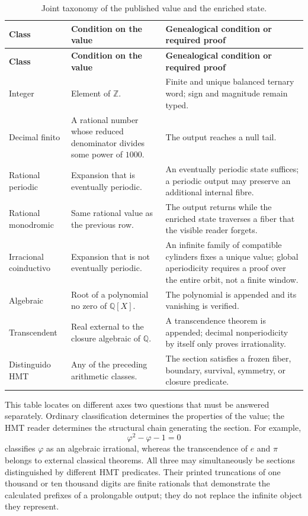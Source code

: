 \begin{longtable}{@{}>{\raggedright\arraybackslash}p{}
                    >{\raggedright\arraybackslash}p{}
                    >{\raggedright\arraybackslash}p{}@{}}
\caption{Joint taxonomy of the published value and the enriched state.}
\label{p3-83-c44-s1:tab:taxonomia-conjunta-numeros-rev11}\\
\toprule
\textbf{Class} & \textbf{Condition on the value} &
\textbf{Genealogical condition or required proof}\\
\midrule
\endfirsthead
\toprule
\textbf{Class} & \textbf{Condition on the value} &
\textbf{Genealogical condition or required proof}\\
\midrule
\endhead
Integer & Element of \(\mathbb Z\). & Finite and unique balanced ternary word; sign and magnitude remain typed.\\
Decimal finito & A rational number whose reduced denominator divides some power
of \(1000\). & The output reaches a null tail.\\
Rational periodic & Expansion that is eventually periodic. & An eventually periodic state suffices; a periodic output may preserve an
additional internal fibre.\\
Rational monodromic & Same rational value as the previous row. & The output returns while the enriched state traverses a fiber that the visible reader forgets.\\
Irracional coinductivo & Expansion that is not eventually periodic. & An infinite family
of compatible cylinders fixes a unique value; global aperiodicity
requires a proof over the entire orbit, not a finite window.\\
Algebraic & Root of a polynomial no zero of \(\mathbb Q[X]\). & The polynomial is appended
and its vanishing is verified.\\
Transcendent & Real external to the closure algebraic of \(\mathbb Q\). & A transcendence theorem is
appended; decimal nonperiodicity by itself
only proves irrationality.\\
Distinguido HMT & Any of the preceding arithmetic classes. & The section satisfies a frozen fiber, boundary, survival,
symmetry, or closure predicate.\\
\bottomrule
\end{longtable}

This table locates on different axes two questions that must be answered
separately. Ordinary classification determines the properties of the value;
the HMT reader determines the structural chain generating the section. For
example,
\[
 \varphi^2-\varphi-1=0
\]
classifies \(\varphi\) as an algebraic irrational, whereas the
transcendence of \(e\) and \(\pi\) belongs to external classical theorems.
All three may simultaneously be sections distinguished by different HMT
predicates. Their printed truncations of one thousand or ten thousand digits are
finite rationals that demonstrate the calculated prefixes of a prolongable output; they do not
replace the infinite object they represent.

